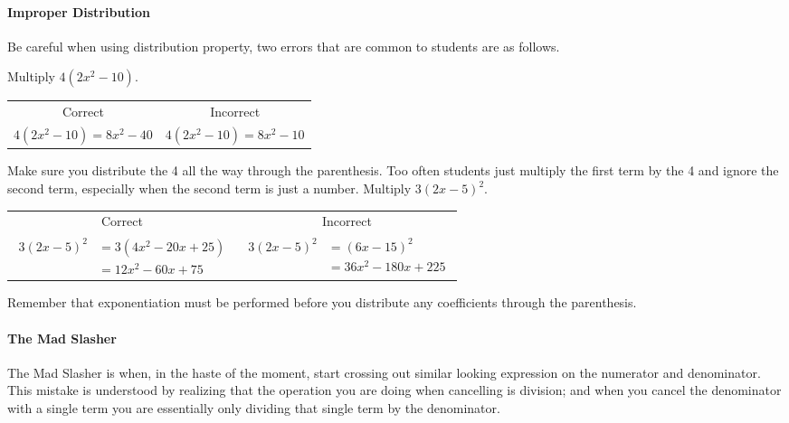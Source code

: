 \paragraph*{Improper Distribution} Be careful when using distribution property, two errors that are common to
students are as follows.
\begin{example}
\Item Multiply $4(2x^2-10)$.
\begin{center}
\begin{tabular}{cc}
Correct & Incorrect\\
$4(2x^2-10)=8x^2-40$ & $4(2x^2-10)=8x^2-10$\\
\end{tabular}
\end{center}
Make sure you distribute the 4 all the way through the parenthesis. Too often
students just multiply the first term by the 4 and ignore the second term, especially when
the second term is just a number.
\Item Multiply $3(2x-5)^2$.
{\setlength{\abovedisplayskip}{0pt}
\begin{center}
\begin{tabular}[b]{cc}
Correct & Incorrect\\
\parbox[b][]{0.3\linewidth}{$
\begin{aligned}
3(2x-5)^2&=3(4x^2-20x+25)\\
 &=12x^2-60x+75
\end{aligned}
$} &
\parbox[b][]{0.3\linewidth}{
\begin{equation*}
\begin{aligned}
3(2x-5)^2&=(6x-15)^2\\
 &=36x^2-180x+225
\end{aligned}
\end{equation*}
}\\
\end{tabular}
\end{center}
}
Remember that exponentiation must be performed before you distribute any
coefficients through the parenthesis.
\end{example}
\paragraph*{The Mad Slasher} The Mad Slasher is when, in the haste of the moment, start crossing out similar
looking expression on the numerator and denominator. This mistake is understood by
realizing that the operation you are doing when cancelling is division; and when you cancel
the denominator with a single term you are essentially only dividing that single term by the
denominator.

